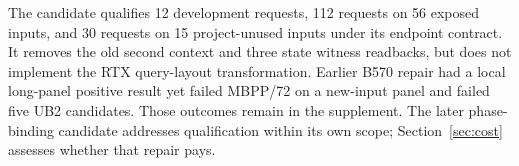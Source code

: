 The candidate qualifies 12 development requests, 112 requests on 56 exposed inputs, and 30 requests on 15 project-unused inputs under its endpoint contract. It removes the old second context and three state witness readbacks, but does not implement the RTX query-layout transformation. Earlier B570 repair had a local long-panel positive result yet failed MBPP/72 on a new-input panel and failed five UB2 candidates. Those outcomes remain in the supplement. The later phase-binding candidate addresses qualification within its own scope; Section~\ref{sec:cost} assesses whether that repair pays.
